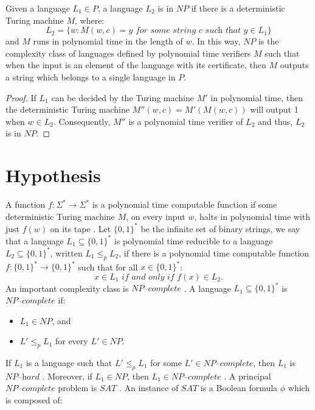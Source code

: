 \documentclass[a4paper,UKenglish,cleveref, autoref]{lipics-v2019}
\begin{document}
\begin{lemma}
\label{verifier}
Given a language $L_{1} \in P$, a language $L_{2}$ is in $NP$ if there is a deterministic Turing machine $M$, where:
\[L_{2} = \{w: M(w, c) = y \textit{ for some string } c \textit{ such that } y \in L_{1}\}\]
and $M$ runs in polynomial time in the length of $w$. In this way, $NP$ is the complexity class of languages defined by polynomial time verifiers $M$ such that when the input is an element of the language with its certificate, then $M$ outputs a string which belongs to a single language in $P$.
\end{lemma}

\begin{proof}
If $L_{1}$ can be decided by the Turing machine $M'$ in polynomial time, then the deterministic Turing machine $M''(w, c) = M'(M(w, c))$ will output 1 when $w \in L_{2}$. Consequently, $M''$ is a polynomial time verifier of $L_{2}$ and thus, $L_{2}$ is in $NP$.
\end{proof}

\section{Hypothesis}

A function $f : \Sigma^{*} \rightarrow \Sigma^{*}$ is a polynomial time computable function if some deterministic Turing machine $M$, on every input $w$, halts in polynomial time with just $f(w)$ on its tape \cite{MS06}. Let $\{0, 1\}^{*}$ be the infinite set of binary strings, we say that a language $L_{1} \subseteq \{0, 1\}^{*}$ is polynomial time reducible to a language $L_{2} \subseteq \{0, 1\}^{*}$, written $L_{1} \leq_{p} L_{2}$, if there is a polynomial time computable function $f : \{0, 1\}^{*} \rightarrow \{0, 1\}^{*}$ such that for all $x \in \{0, 1\}^{*}$:
\[x \in L_{1} \textit{ if and only if } f(x) \in L_{2}.\]
An important complexity class is $\textit{NP--complete}$ \cite{GJ79}. A language $L_{1} \subseteq \{0, 1\}^{*}$ is $\textit{NP--complete}$ if:

\begin{itemize}
\item $L_{1} \in NP$, and
\item $L' \leq_{p} L_{1}$ for every $L' \in NP$.
\end{itemize}

If $L_{1}$ is a language such that $L' \leq_{p} L_{1}$ for some $L' \in \textit{NP--complete}$, then $L_{1}$ is $\textit{NP--hard}$ \cite{CLRS01}. Moreover, if $L_{1} \in NP$, then $L_{1} \in \textit{NP--complete}$ \cite{CLRS01}. A principal $\textit{NP--complete}$ problem is $SAT$ \cite{GJ79}. An instance of $SAT$ is a Boolean formula $\phi$ which is composed of:
\end{document}
